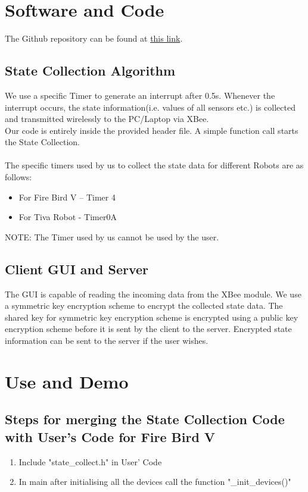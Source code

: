 \documentclass[a4paper,12pt,oneside]{book}
\begin{document}
\newpage
\section{Software and Code}
The Github repository can be found at 
 \href{https://github.com/eYSIP-2016/Robot_State_Collector/tree/master/code}{this link}. 
\subsection{State Collection Algorithm}
We use a specific Timer to generate an interrupt after 0.5s. Whenever the interrupt occurs, the state information(i.e. values of all sensors etc.) is collected and transmitted wirelessly to the PC/Laptop via XBee.\\
    Our code is entirely inside the provided header file. A simple function call starts the State Collection.\\
\\
The specific timers used by us to collect the state data for different Robots are as follows:
\begin{itemize}
\item For Fire Bird V -- Timer 4
\item For Tiva Robot - Timer0A
\end{itemize}

NOTE: The Timer used by us cannot be used by the user. 

\subsection{Client GUI and Server}

The GUI is capable of reading the incoming data from the XBee module. We use a symmetric key encryption scheme to encrypt the collected state data. The shared key for symmetric key encryption scheme is encrypted using a public key encryption scheme before it is sent by the client to the server. Encrypted state information can be sent to the server if the user wishes.

\newpage

\section{Use and Demo}

\subsection{Steps for merging the State Collection Code with User's Code for Fire Bird V}
\begin{enumerate}

\item Include "state\_collect.h" in User' Code

\item In main after initialising all the devices call the function  "\_init\_devices()"

\end{enumerate}
\end{document}
